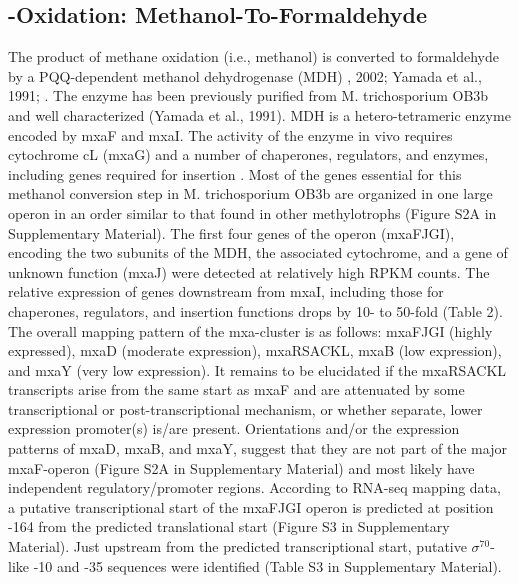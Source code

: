 \subsection{-Oxidation: Methanol-To-Formaldehyde}
The product of methane oxidation (i.e., methanol) is converted to formaldehyde by a PQQ-dependent methanol dehydrogenase (MDH) \cite{anthony1982}, 2002; Yamada et al., 1991; \cite{anthony1994}.
The enzyme has been previously purified from M. trichosporium OB3b and well characterized (Yamada et al., 1991).
MDH is a hetero-tetrameric enzyme encoded by mxaF and mxaI.
The activity of the enzyme in vivo requires cytochrome cL (mxaG) and a number of chaperones, regulators, and enzymes, including genes required for  insertion \cite{anthony1994, anthony2002}.
Most of the genes essential for this methanol conversion step in M. trichosporium OB3b are organized in one large operon in an order similar to that found in other methylotrophs (Figure S2A in Supplementary Material).
The first four genes of the operon (mxaFJGI), encoding the two subunits of the MDH, the associated cytochrome, and a gene of unknown function (mxaJ) were detected at relatively high RPKM counts.
The relative expression of genes downstream from mxaI, including those for chaperones, regulators, and  insertion functions drops by 10- to 50-fold (Table 2).
The overall mapping pattern of the mxa-cluster is as follows: mxaFJGI (highly expressed), mxaD (moderate expression), mxaRSACKL, mxaB (low expression), and mxaY (very low expression).
It remains to be elucidated if the mxaRSACKL transcripts arise from the same start as mxaF and are attenuated by some transcriptional or post-transcriptional mechanism, or whether separate, lower expression promoter(s) is/are present.
Orientations and/or the expression patterns of mxaD, mxaB, and mxaY, suggest that they are not part of the major mxaF-operon (Figure S2A in Supplementary Material) and most likely have independent regulatory/promoter regions.
According to RNA-seq mapping data, a putative transcriptional start of the mxaFJGI operon is predicted at position -164 from the predicted translational start (Figure S3 in Supplementary Material).
Just upstream from the predicted transcriptional start, putative $\sigma^{70}$-like -10 and -35 sequences were identified (Table S3 in Supplementary Material).

